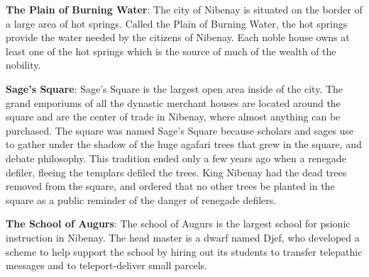 {	\textbf{The Plain of Burning Water}: The city of Nibenay is situated on the border of a large area of hot springs. Called the Plain of Burning Water, the hot springs provide the water needed by the citizens of Nibenay. Each noble house owns at least one of the hot springs which is the source of much of the wealth of the nobility.

	\textbf{Sage's Square}: Sage's Square is the largest open area inside of the city. The grand emporiums of all the dynastic merchant houses are located around the square and are the center of trade in Nibenay, where almost anything can be purchased. The square was named Sage's Square because scholars and sages use to gather under the shadow of the huge agafari trees that grew in the square, and debate philosophy. This tradition ended only a few years ago when a renegade defiler, fleeing the templars defiled the trees. King Nibenay had the dead trees removed from the square, and ordered that no other trees be planted in the square as a public reminder of the danger of renegade defilers.

	\textbf{The School of Augurs}: The school of Augurs is the largest school for psionic instruction in Nibenay. The head master is a dwarf named Djef, who developed a scheme to help support the school by hiring out its students to transfer telepathic messages and to teleport-deliver small parcels.
}
